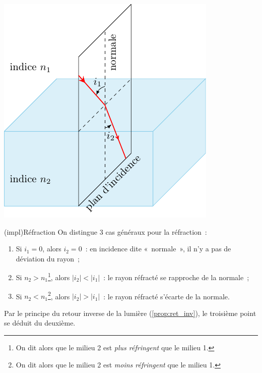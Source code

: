 \documentclass[../../main/main.tex]{subfiles}
\begin{document}
\begin{tcb}[label=loi:snelldescartes]
\begin{minipage}{0.45\linewidth}
\begin{center}
			\includegraphics[width=\linewidth]{snell_refr_nsup.pdf}
			\label{fig:snell_refl}
		\end{center}
	\end{minipage}
\end{tcb}

\begin{tcb}[label=impl:refr](impl){Réfraction}
	On distingue 3 cas généraux pour la réfraction~:
	\begin{enumerate}

		\item Si $i_1 = 0$, alors $i_2 = 0$~: en incidence dite «~normale~», il
		      n'y a pas de déviation du rayon~;
		\item Si $n_2 > n_1$\footnote{On dit alors que le milieu 2 est
			      \textit{plus réfringent} que le milieu 1.}, alors $ \left| i_2
			      \right| < \left| i_1 \right|$~: le rayon réfracté se rapproche de la
		      normale~;
		\item Si $n_2 < n_1$\footnote{On dit alors que le milieu 2 est
			      \textit{moins réfringent} que le milieu 1.}, alors $|i_2| > |i_1|$~:
		      le rayon réfracté s'écarte de la normale.

	\end{enumerate}
	Par le principe du retour inverse de la lumière (\ref{prop:ret_inv}), le
	troisième point se déduit du deuxième.
\end{tcb}
\end{document}
